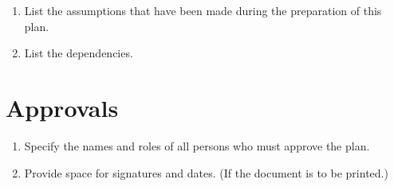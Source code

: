 \begin{enumerate}
	\item List the assumptions that have been made during the preparation of this plan.
	\item List the dependencies.
\end{enumerate}

\section{Approvals}

\begin{enumerate}
	\item Specify the names and roles of all persons who must approve the plan.
	\item Provide space for signatures and dates. (If the document is to be printed.)
\end{enumerate}
